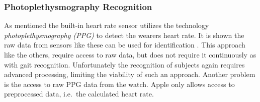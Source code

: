 \subsubsection{Photoplethysmography Recognition}
As mentioned the built-in heart rate sensor utilizes the technology
\textit{photoplethysmography (PPG)} to detect the wearers heart rate. It is shown the
raw data from sensors like these can be used for identification
\cite{kavsaoglu2013a}. This approach like the others, require access to raw
data, but does not require it continuously as with gait recognition.
Unfortunately the recognition of subjects again requires advanced processing,
limiting the viability of such an approach. Another problem is the access to raw
PPG data from the watch. Apple only allows access to preprocessed data, i.e.\
the calculated heart rate.
